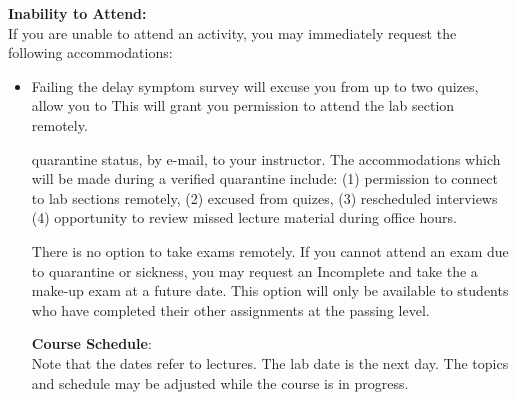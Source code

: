 \documentclass[12pt]{article}
\begin{document}
\noindent
\textbf{Inability to Attend:}\\
If you are unable to attend an activity, you may immediately request the following accommodations:
\begin{itemize}
  \item 





Failing the delay symptom survey will excuse you from up to two quizes, allow you to This will grant you permission to
attend the lab section remotely.





quarantine status, by e-mail,
to your instructor.  The accommodations which will be made during a
verified quarantine include: (1) permission to connect to lab sections
remotely, (2) excused from quizes, (3) rescheduled interviews (4)
opportunity to review missed lecture material during office hours.

There is no option to take exams remotely.  If you cannot attend an
exam due to quarantine or sickness, you may request an Incomplete and
take the a make-up exam at a future date.  This option will only be
available to students who have completed their other assignments at
the passing level.

\newpage

\noindent
\textbf {Course Schedule}:\\
Note that the dates refer to lectures.  The lab date is the next day.
The topics and schedule may be adjusted while the course is in
progress.\\



\end{itemize}
\end{document}
